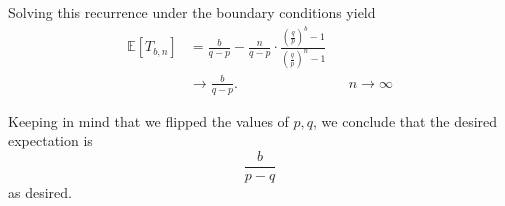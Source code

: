 \documentclass[10pt]{article}
\newcommand{\E}{\mathbb{E}}
\begin{document}
Solving this recurrence under the boundary conditions yield
\begin{align*}
  \E[T_{b, n}]
  &= \frac{b}{q-p} - \frac{n}{q-p}\cdot \frac{\left( \frac qp \right)^b - 1}{\left( \frac qp \right)^n - 1} \\
  &\to \frac{b}{q-p}. &&n\to \infty
\end{align*}

Keeping in mind that we flipped the values of $p, q$,
we conclude that the desired expectation is
\[
  \frac{b}{p-q}
\]
as desired.

\clearpage
\section{}
\section{}
\end{document}
